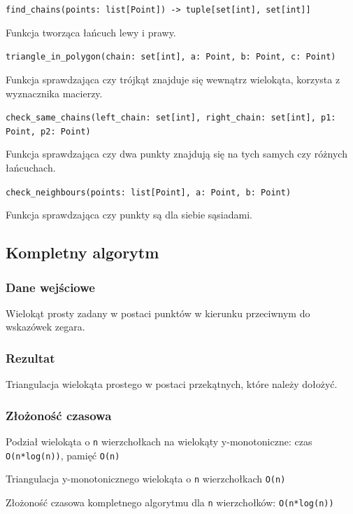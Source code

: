 \documentclass[12pt]{article}
\begin{document}
\verb|find_chains(points: list[Point]) -> tuple[set[int], set[int]]|

Funkcja tworząca łańcuch lewy i prawy.
\mbox{}\newline

\verb|triangle_in_polygon(chain: set[int], a: Point, b: Point, c: Point)|

Funkcja sprawdzająca czy trójkąt znajduje się wewnątrz wielokąta, korzysta z wyznacznika macierzy.
\mbox{}\newline

\verb|check_same_chains(left_chain: set[int], right_chain: set[int], p1: Point, p2: Point)|

Funkcja sprawdzająca czy dwa punkty znajdują się na tych samych czy różnych łańcuchach.
\mbox{}\newline

\verb|check_neighbours(points: list[Point], a: Point, b: Point)|

Funkcja sprawdzająca czy punkty są dla siebie sąsiadami.
\mbox{}\newline

\subsection*{Kompletny algorytm}
\subsubsection*{Dane wejściowe}
Wielokąt prosty zadany w postaci punktów w kierunku przeciwnym do wskazówek zegara.

\subsubsection*{Rezultat}
Triangulacja wielokąta prostego w postaci przekątnych, które należy dołożyć.

\subsubsection*{Złożoność czasowa}
Podział wielokąta o \verb|n| wierzchołkach na wielokąty y-monotoniczne: czas \verb|O(n*log(n))|, pamięć \verb|O(n)|

Triangulacja y-monotonicznego wielokąta o \verb|n| wierzchołkach \verb|O(n)|
\mbox{}\newline

Złożoność czasowa kompletnego algorytmu dla \verb|n| wierzchołków: \verb|O(n*log(n))|
\end{document}
